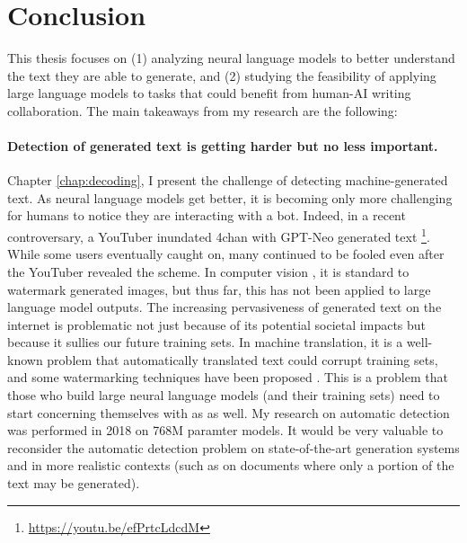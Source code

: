 \chapter{Conclusion}

This thesis focuses on (1) analyzing neural language models to better understand the text they are able to generate, and (2) studying the feasibility of applying large language models to tasks that could benefit from human-AI writing collaboration.
The main takeaways from my research are the following:

\subsubsection{Detection of generated text is getting harder but no less important.}
	Chapter \ref{chap:decoding}, I present the challenge of detecting machine-generated text.
	As neural language models get better, it is becoming only more challenging for humans to notice they are interacting with a bot.
	Indeed, in a recent controversary, a YouTuber inundated 4chan with GPT-Neo generated text \footnote{\url{https://youtu.be/efPrtcLdcdM}}.
	While some users eventually caught on, many continued to be fooled even after the YouTuber revealed the scheme.
	In computer vision \citep{saharia2022photorealistic,ramesh2022hierarchical}, it is standard to watermark generated images, but thus far, this has not been applied to large language model outputs.
	The increasing pervasiveness of generated text on the internet is problematic not just because of its potential societal impacts but because it sullies our future training sets.
	In machine translation, it is a well-known problem that automatically translated text could corrupt training sets, and some watermarking techniques have been proposed \citep{venugopal2011watermarking}.
	This is a problem that those who build large neural language models (and their training sets) need to start concerning themselves with as as well.
	My research on automatic detection was performed in 2018 on 768M paramter models.
	It would be very valuable to reconsider the automatic detection problem on state-of-the-art generation systems and in more realistic contexts (such as on documents where only a portion of the text may be generated).

